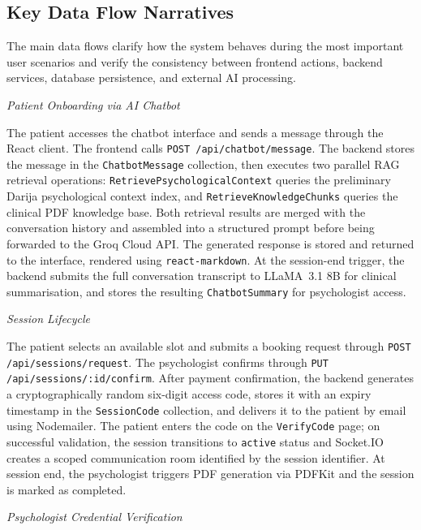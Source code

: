 \documentclass[a4paper,12pt]{report}
\begin{document}
\subsection{Key Data Flow Narratives}

The main data flows clarify how the system behaves during the most important user scenarios and verify the consistency between frontend actions, backend services, database persistence, and external AI processing.

\vspace{0.3cm}
\noindent\emph{Patient Onboarding via AI Chatbot}

The patient accesses the chatbot interface and sends a message through the React client. The frontend calls \texttt{POST /api/chatbot/message}. The backend stores the message in the \texttt{ChatbotMessage} collection, then executes two parallel RAG retrieval operations: \texttt{RetrievePsychologicalContext} queries the preliminary Darija psychological context index, and \texttt{RetrieveKnowledgeChunks} queries the clinical PDF knowledge base. Both retrieval results are merged with the conversation history and assembled into a structured prompt before being forwarded to the Groq Cloud API. The generated response is stored and returned to the interface, rendered using \texttt{react-markdown}. At the session-end trigger, the backend submits the full conversation transcript to LLaMA~3.1 8B for clinical summarisation, and stores the resulting \texttt{ChatbotSummary} for psychologist access.

\vspace{0.3cm}
\noindent\emph{Session Lifecycle}

The patient selects an available slot and submits a booking request through \texttt{POST /api/sessions/request}. The psychologist confirms through \texttt{PUT /api/sessions/:id/confirm}. After payment confirmation, the backend generates a cryptographically random six-digit access code, stores it with an expiry timestamp in the \texttt{SessionCode} collection, and delivers it to the patient by email using Nodemailer. The patient enters the code on the \texttt{VerifyCode} page; on successful validation, the session transitions to \texttt{active} status and Socket.IO creates a scoped communication room identified by the session identifier. At session end, the psychologist triggers PDF generation via PDFKit and the session is marked as completed.

\vspace{0.3cm}
\noindent\emph{Psychologist Credential Verification}
\end{document}
